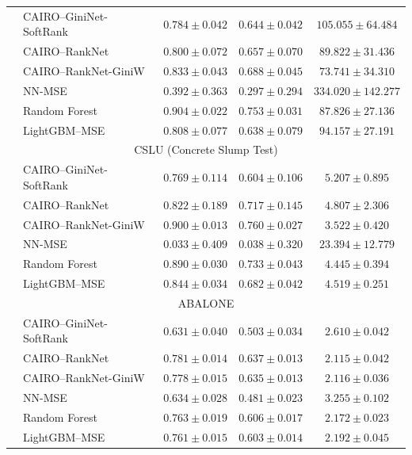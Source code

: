 \documentclass[11pt]{article}
\theoremstyle{plain}
\theoremstyle{plain}
\theoremstyle{plain}
\theoremstyle{plain}
\theoremstyle{plain}
\theoremstyle{plain}
\theoremstyle{plain}
\begin{document}
\begin{table}
\begin{tabular}{llccc}
        \midrule
        & \textsc{CAIRO}--GiniNet-SoftRank
        & $0.784 \pm 0.042$ & $0.644 \pm 0.042$ & $105.055 \pm 64.484$ \\
        & \textsc{CAIRO}--RankNet
        & $0.800 \pm 0.072$ & $0.657 \pm 0.070$ & $89.822 \pm 31.436$ \\
        & \textsc{CAIRO}--RankNet-GiniW
        & $0.833 \pm 0.043$ & $0.688 \pm 0.045$ & $\mathbf{73.741 \pm 34.310}$ \\
        & NN-MSE
        & $0.392 \pm 0.363$ & $0.297 \pm 0.294$ & $334.020 \pm 142.277$ \\
        & Random Forest
        & $\mathbf{0.904 \pm 0.022}$ & $\mathbf{0.753 \pm 0.031}$ & $87.826 \pm 27.136$ \\
        & LightGBM--MSE
        & $0.808 \pm 0.077$ & $0.638 \pm 0.079$ & $94.157 \pm 27.191$ \\
        \midrule
        \multicolumn{5}{c}{CSLU (Concrete Slump Test)} \\
        \midrule
        & \textsc{CAIRO}--GiniNet-SoftRank
        & $0.769 \pm 0.114$ & $0.604 \pm 0.106$ & $5.207 \pm 0.895$ \\
        & \textsc{CAIRO}--RankNet
        & $0.822 \pm 0.189$ & $0.717 \pm 0.145$ & $4.807 \pm 2.306$ \\
        & \textsc{CAIRO}--RankNet-GiniW
        & $\mathbf{0.900 \pm 0.013}$ & $\mathbf{0.760 \pm 0.027}$ & $\mathbf{3.522 \pm 0.420}$ \\
        & NN-MSE
        & $0.033 \pm 0.409$ & $0.038 \pm 0.320$ & $23.394 \pm 12.779$ \\
        & Random Forest
        & $0.890 \pm 0.030$ & $0.733 \pm 0.043$ & $4.445 \pm 0.394$ \\
        & LightGBM--MSE
        & $0.844 \pm 0.034$ & $0.682 \pm 0.042$ & $4.519 \pm 0.251$ \\
        \midrule
        \multicolumn{5}{c}{ABALONE} \\
        \midrule
        & \textsc{CAIRO}--GiniNet-SoftRank
        & $0.631 \pm 0.040$ & $0.503 \pm 0.034$ & $2.610 \pm 0.042$ \\
        & \textsc{CAIRO}--RankNet
        & $\mathbf{0.781 \pm 0.014}$ & $\mathbf{0.637 \pm 0.013}$ & $\mathbf{2.115 \pm 0.042}$ \\
        & \textsc{CAIRO}--RankNet-GiniW
        & $0.778 \pm 0.015$ & $0.635 \pm 0.013$ & $2.116 \pm 0.036$ \\
        & NN-MSE
        & $0.634 \pm 0.028$ & $0.481 \pm 0.023$ & $3.255 \pm 0.102$ \\
        & Random Forest
        & $0.763 \pm 0.019$ & $0.606 \pm 0.017$ & $2.172 \pm 0.023$ \\
        & LightGBM--MSE
        & $0.761 \pm 0.015$ & $0.603 \pm 0.014$ & $2.192 \pm 0.045$ \\
        \bottomrule
    \end{tabular}
\end{table}
\end{document}
